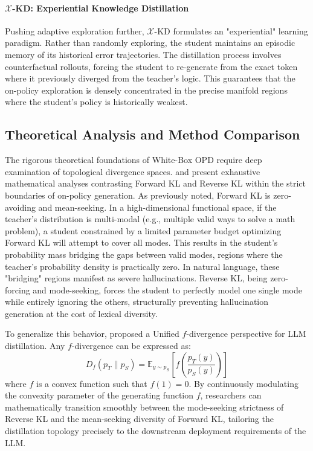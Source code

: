 \documentclass{article} %
\begin{document}
\paragraph{$\mathcal{X}$-KD: Experiential Knowledge Distillation}
Pushing adaptive exploration further, $\mathcal{X}$-KD \citep{2602.12674} formulates an "experiential" learning paradigm. Rather than randomly exploring, the student maintains an episodic memory of its historical error trajectories. The distillation process involves counterfactual rollouts, forcing the student to re-generate from the exact token where it previously diverged from the teacher's logic. This guarantees that the on-policy exploration is densely concentrated in the precise manifold regions where the student's policy is historically weakest.

\subsection{Theoretical Analysis and Method Comparison}
\label{subsec:theory_whitebox}

The rigorous theoretical foundations of White-Box OPD require deep examination of topological divergence spaces. \citet{2404.02657} and \citet{2402.11890} present exhaustive mathematical analyses contrasting Forward KL and Reverse KL within the strict boundaries of on-policy generation. As previously noted, Forward KL is zero-avoiding and mean-seeking. In a high-dimensional functional space, if the teacher's distribution is multi-modal (e.g., multiple valid ways to solve a math problem), a student constrained by a limited parameter budget optimizing Forward KL will attempt to cover all modes. This results in the student's probability mass bridging the gaps between valid modes, regions where the teacher's probability density is practically zero. In natural language, these "bridging" regions manifest as severe hallucinations. Reverse KL, being zero-forcing and mode-seeking, forces the student to perfectly model one single mode while entirely ignoring the others, structurally preventing hallucination generation at the cost of lexical diversity.

To generalize this behavior, \citet{2307.15190} proposed a Unified $f$-divergence perspective for LLM distillation. Any $f$-divergence can be expressed as:
\begin{equation}
    D_f(p_T \parallel p_S) = \mathbb{E}_{y \sim p_S} \left[ f \left( \frac{p_T(y)}{p_S(y)} \right) \right]
\end{equation}
where $f$ is a convex function such that $f(1)=0$. By continuously modulating the convexity parameter of the generating function $f$, researchers can mathematically transition smoothly between the mode-seeking strictness of Reverse KL and the mean-seeking diversity of Forward KL, tailoring the distillation topology precisely to the downstream deployment requirements of the LLM.
\end{document}
